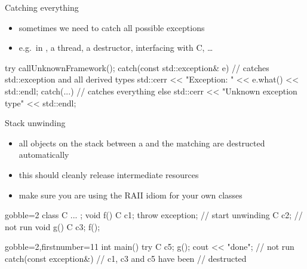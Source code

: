 \begin{frame}[fragile]
  \begin{block}{Catching everything}
    \begin{itemize}
    \item sometimes we need to catch all possible exceptions
    \item e.g.\ in , a thread, a destructor, interfacing with C, \ldots
    \end{itemize}
  \end{block}
  \begin{cppcode}

    try {
      callUnknownFramework();
    } catch(const std::exception& e) {
      // catches std::exception and all derived types
      std::cerr << "Exception: " << e.what() << std::endl;
    } catch(...) {
      // catches everything else
      std::cerr << "Unknown exception type" << std::endl;
    }
  \end{cppcode}
\end{frame}

\begin{frame}[fragile]
  \begin{block}{Stack unwinding}
    \begin{itemize}
      \item all objects on the stack between a  and the matching  are destructed automatically
      \item this should cleanly release intermediate resources
      \item make sure you are using the RAII idiom for your own classes
    \end{itemize}
  \end{block}
  \begin{multicols}{2}
    \begin{cppcode*}{gobble=2}
      class C { ... };
      void f() {
        C c1;
        throw exception{};
          // start unwinding
        C c2; // not run
      }
      void g() {
        C c3; f();
      }
    \end{cppcode*}
    \columnbreak
    \begin{cppcode*}{gobble=2,firstnumber=11}
      int main() {
        try {
          C c5;
          g();
          cout << "done"; // not run
        } catch(const exception&) {
          // c1, c3 and c5 have been
          // destructed
        }
      }
    \end{cppcode*}
  \end{multicols}
\end{frame}

